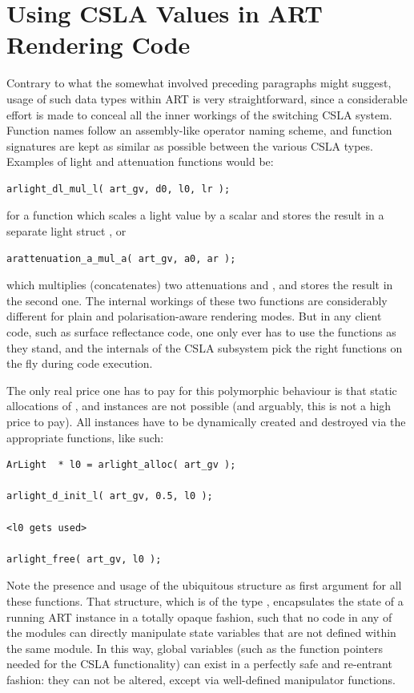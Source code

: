 \section{Using CSLA Values in ART Rendering Code}

Contrary to what the somewhat involved preceding paragraphs might suggest, usage
of such data types within ART is very straightforward, since a considerable effort is made to
conceal all the inner workings of the switching CSLA system. Function names follow an assembly-like operator naming scheme, and function signatures are kept as similar as possible between the various CSLA types. Examples of light and attenuation functions would be:
\begin{verbatim}
arlight_dl_mul_l( art_gv, d0, l0, lr );
\end{verbatim}
for a function which scales a light value  by a scalar  and stores the result in a separate light struct , or
\begin{verbatim}
arattenuation_a_mul_a( art_gv, a0, ar );
\end{verbatim}
which multiplies (\ie concatenates) two attenuations  and , and stores the result in the second one. The internal workings of these two functions are considerably different for plain and polarisation-aware rendering modes. But in any client code, such as surface reflectance code, one only ever has to use the functions as they stand, and the internals of the CSLA subsystem pick the right functions on the fly during code execution.

The only real price one has to pay for this polymorphic behaviour is that static allocations of ,  and  instances are not possible (and arguably, this is not a high price to pay). All instances have to be dynamically created and destroyed via the appropriate functions, like such:

\begin{verbatim}
ArLight  * l0 = arlight_alloc( art_gv );

arlight_d_init_l( art_gv, 0.5, l0 );

<l0 gets used>

arlight_free( art_gv, l0 );
\end{verbatim}

Note the presence and usage of the ubiquitous  structure as first argument for all these functions. That structure, which is of the type , encapsulates the state of a running ART instance in a totally opaque fashion, \ie such that no code in any of the modules can directly manipulate state variables that are not defined within the same module. In this way, global variables (such as the function pointers needed for the CSLA functionality) can exist in a perfectly safe and re-entrant fashion: they can not be altered, except via well-defined manipulator functions.

